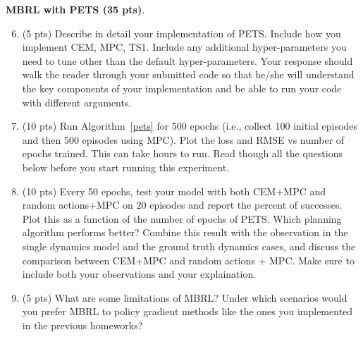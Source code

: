 \documentclass[12pt]{article}
\begin{document}
\textbf{MBRL with PETS (35 pts)}.  

\begin{enumerate}
    \setcounter{enumi}{5}
    \item (5 pts) Describe in detail your implementation of PETS. Include how you implement CEM, MPC, TS1. Include any additional hyper-parameters you need to tune other than the default hyper-parameters. Your response should walk the reader through your submitted code so that he/she will understand the key components of your implementation and be able to run your code with different arguments.
    \begin{solution}
    \end{solution}
    \item (10 pts) Run Algorithm~\ref{pets} for 500 epochs (i.e., collect 100 initial episodes and then 500 episodes using MPC).  Plot the loss and RMSE vs number of epochs trained. This can take hours to run. Read though all the questions below before you start running this experiment.
    \begin{solution}
    \end{solution}
    \item (10 pts) Every 50 epochs, test your model with both CEM+MPC and random actions+MPC on 20 episodes and report the percent of successes.  Plot this as a function of the number of epochs of PETS. Which planning algorithm performs better? Combine this result with the observation in the single dynamics model and the ground truth dynamics cases, and discuss the comparison between CEM+MPC and random actions + MPC. Make sure to include both your observations and your explaination.
    \begin{solution}
    \end{solution}
    \item (5 pts) What are some limitations of MBRL?  Under which scenarios would you prefer MBRL to policy gradient methods like the ones you implemented in the previous homeworks?
    \begin{solution}
    \end{solution}
\end{enumerate}
\end{document}
